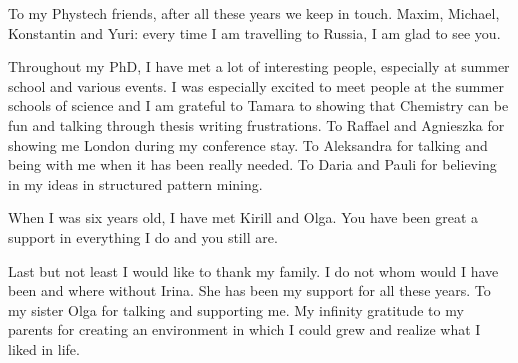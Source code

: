 To my Phystech friends, after all these years we keep in touch. Maxim, Michael, Konstantin and Yuri: every time I am travelling to Russia, I am glad to see you.

Throughout my PhD, I have met a lot of interesting people, especially at summer school and various events. I was especially excited to meet people at the summer schools of science and I am grateful to Tamara to showing that Chemistry can be fun and talking through thesis writing frustrations. To Raffael and Agnieszka for showing me London during my conference stay. To Aleksandra for talking and being with me when it has been really needed. To Daria and Pauli for believing in my ideas in structured pattern mining.

When I was six years old, I have met Kirill and Olga. You have been great a support in everything I do and you still are.

Last but not least I would like to thank my family. I do not whom would I have been and where without Irina. She has been my support for all these years. To my sister Olga for talking and supporting me. My infinity gratitude to my parents for creating an environment in which I could grew and realize what I liked in life.

